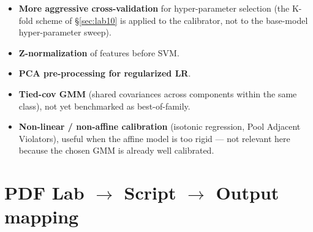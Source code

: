 \documentclass[11pt,a4paper]{article}
\begin{document}
\begin{itemize}
\item \textbf{More aggressive cross-validation} for hyper-parameter
      selection (the K-fold scheme of \S\ref{sec:lab10} is applied
      to the calibrator, not to the base-model hyper-parameter
      sweep).
\item \textbf{Z-normalization} of features before SVM.
\item \textbf{PCA pre-processing for regularized LR}.
\item \textbf{Tied-cov GMM} (shared covariances across components
      within the same class), not yet benchmarked as best-of-family.
\item \textbf{Non-linear / non-affine calibration} (isotonic
      regression, Pool Adjacent Violators), useful when the affine
      model is too rigid --- not relevant here because the chosen
      GMM is already well calibrated.
\end{itemize}

\appendix
\section{PDF Lab \texorpdfstring{$\rightarrow$}{->} Script
          \texorpdfstring{$\rightarrow$}{->} Output mapping}
\end{document}
